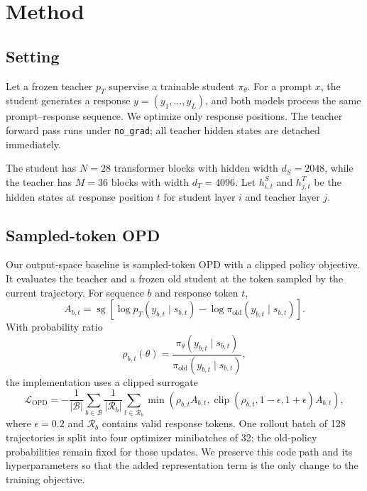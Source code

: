 \documentclass[10pt,twocolumn]{article}
\newcommand{\stopgrad}{\operatorname{sg}}
\begin{document}
\section{Method}

\subsection{Setting}

Let a frozen teacher $p_T$ supervise a trainable student $\pi_\theta$. For a prompt $x$, the student generates a response $y=(y_1,\ldots,y_L)$, and both models process the same prompt--response sequence. We optimize only response positions. The teacher forward pass runs under \texttt{no\_grad}; all teacher hidden states are detached immediately.

The student has $N=28$ transformer blocks with hidden width $d_S=2048$, while the teacher has $M=36$ blocks with width $d_T=4096$. Let $h^S_{i,t}$ and $h^T_{j,t}$ be the hidden states at response position $t$ for student layer $i$ and teacher layer $j$.

\subsection{Sampled-token OPD}

Our output-space baseline is sampled-token OPD with a clipped policy objective. It evaluates the teacher and a frozen old student at the token sampled by the current trajectory. For sequence $b$ and response token $t$,
\begin{equation}
A_{b,t}=\stopgrad\!\left[\log p_T(y_{b,t}\mid s_{b,t})-
\log\pi_{\mathrm{old}}(y_{b,t}\mid s_{b,t})\right].
\end{equation}
With probability ratio
\begin{equation}
\rho_{b,t}(\theta)=\frac{\pi_\theta(y_{b,t}\mid s_{b,t})}
{\pi_{\mathrm{old}}(y_{b,t}\mid s_{b,t})},
\end{equation}
the implementation uses a clipped surrogate
\begin{equation}
\mathcal{L}_{\mathrm{OPD}}=-\frac{1}{|\mathcal{B}|}
\sum_{b\in\mathcal{B}}\frac{1}{|\mathcal{R}_b|}
\sum_{t\in\mathcal{R}_b}
\min\!\left(\rho_{b,t}A_{b,t},
\operatorname{clip}(\rho_{b,t},1-\epsilon,1+\epsilon)A_{b,t}\right),
\end{equation}
where $\epsilon=0.2$ and $\mathcal{R}_b$ contains valid response tokens. One rollout batch of 128 trajectories is split into four optimizer minibatches of 32; the old-policy probabilities remain fixed for those updates. We preserve this code path and its hyperparameters so that the added representation term is the only change to the training objective.
\end{document}
